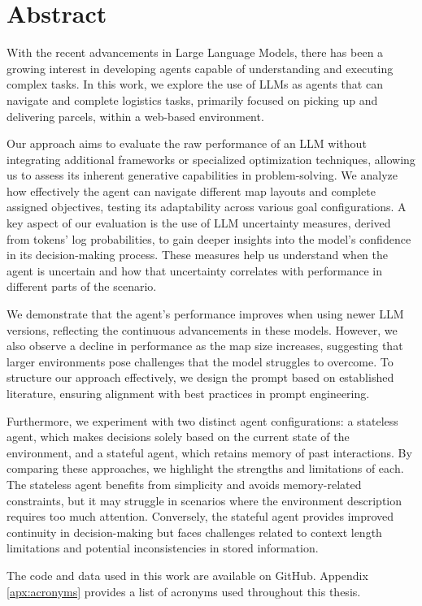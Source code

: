 \chapter*{Abstract}
\label{cha:abstract}

With the recent advancements in Large Language Models, there has been a growing interest
in developing agents capable of understanding and executing complex tasks. In
this work, we explore the use of LLMs as agents that can navigate and complete logistics
tasks, primarily focused on picking up and delivering parcels, within a web-based
environment.

Our approach aims to evaluate the raw performance of an LLM without integrating additional
frameworks or specialized optimization techniques, allowing us to assess its
inherent generative capabilities in problem-solving. We analyze how effectively the
agent can navigate different map layouts and complete assigned objectives,
testing its adaptability across various goal configurations. A key aspect of our
evaluation is the use of LLM uncertainty measures, derived from tokens' log probabilities,
to gain deeper insights into the model's confidence in its decision-making
process. These measures help us understand when the agent is uncertain and how that
uncertainty correlates with performance in different parts of the scenario.

We demonstrate that the agent's performance improves when using newer LLM versions,
reflecting the continuous advancements in these models. However, we also observe
a decline in performance as the map size increases, suggesting that larger environments
pose challenges that the model struggles to overcome. To structure our approach
effectively, we design the prompt based on established literature, ensuring
alignment with best practices in prompt engineering.

Furthermore, we experiment with two distinct agent configurations: a stateless
agent, which makes decisions solely based on the current state of the environment,
and a stateful agent, which retains memory of past interactions. By comparing
these approaches, we highlight the strengths and limitations of each. The
stateless agent benefits from simplicity and avoids memory-related constraints, but
it may struggle in scenarios where the environment description requires too much
attention. Conversely, the stateful agent provides improved continuity in decision-making
but faces challenges related to context length limitations and potential inconsistencies
in stored information.

The code and data used in this work are available on GitHub\cite{projectrepo}. Appendix
\ref{apx:acronyms} provides a list of acronyms used throughout this thesis.